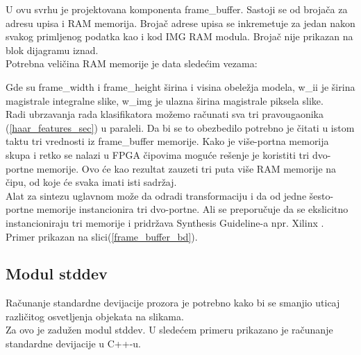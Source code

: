 U ovu svrhu je projektovana komponenta frame\_buffer.
Sastoji se od brojača za adresu upisa i RAM memorija.
Brojač adrese upisa se inkremetuje za jedan nakon svakog primljenog podatka kao
i kod IMG RAM modula.
Brojač nije prikazan na blok dijagramu iznad. \\
Potrebna veličina RAM memorije je data sledećim vezama:

\begin{figure}[H]
  \begin{subfigure}
    \begin{equation}
      size[bit] = frame\_width * frame\_height * w\_ii
      \label{frame_buffer_eq1}
    \end{equation}
  \end{subfigure}
  \hfill
  \begin{subfigure}
    \begin{equation}
      w\_ii = ceil(log_2(frame\_width * frame\_height * 2^{w\_img}))
      \label{frame_buffer_eq2}
    \end{equation}
  \end{subfigure}
\end{figure}

Gde su frame\_width i frame\_height širina i visina obeležja modela, w\_ii je
širina magistrale integralne slike, w\_img je ulazna širina magistrale piksela
slike. \\

Radi ubrzavanja rada klasifikatora možemo računati sva tri pravougaonika (\ref{haar_features_sec}) u paraleli.
Da bi se to obezbedilo potrebno je čitati u istom taktu tri vrednosti iz
frame\_buffer memorije.
Kako je više-portna memorija skupa i retko se nalazi u FPGA čipovima moguće
rešenje je koristiti tri dvo-portne memorije.
Ovo će kao rezultat zauzeti tri puta više RAM memorije na čipu, od koje će svaka
imati isti sadržaj.\\

Alat za sintezu uglavnom može da odradi transformaciju i da od jedne šesto-portne
memorije instancionira tri dvo-portne.
Ali se preporučuje da se ekslicitno instancioniraju tri memorije i pridržava
Synthesis Guideline-a npr. Xilinx \cite{XST}. \\
Primer prikazan na slici(\ref{frame_buffer_bd}).

\subsection{Modul stddev}

Računanje standardne devijacije prozora je potrebno kako bi se smanjio uticaj
različitog osvetljenja objekata na slikama. \\
Za ovo je zadužen modul stddev. U sledećem primeru prikazano je računanje
standardne devijacije u C++-u.

